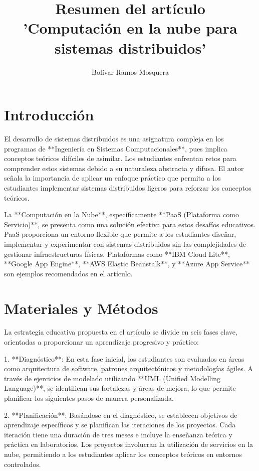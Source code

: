 \documentclass[9pt,twocolumn,twoside]{opticajnl}
\title{Resumen del artículo 'Computación en la nube para sistemas distribuidos'}
\author[1]{Bolívar Ramos Mosquera}
\affil[*]{Resumen hecho porFernanda Elizabeth Basurto Muñoz y Willian Javier Cedeño Bravo}
\affil[1]{Universidad de Guayaquil, Ecuador.}
\begin{document}
\maketitle

\section{Introducción}
El desarrollo de sistemas distribuidos es una asignatura compleja en los programas de **Ingeniería en Sistemas Computacionales**, pues implica conceptos teóricos difíciles de asimilar. Los estudiantes enfrentan retos para comprender estos sistemas debido a su naturaleza abstracta y difusa. El autor señala la importancia de aplicar un enfoque práctico que permita a los estudiantes implementar sistemas distribuidos ligeros para reforzar los conceptos teóricos.

La **Computación en la Nube**, específicamente **PaaS (Plataforma como Servicio)**, se presenta como una solución efectiva para estos desafíos educativos. PaaS proporciona un entorno flexible que permite a los estudiantes diseñar, implementar y experimentar con sistemas distribuidos sin las complejidades de gestionar infraestructuras físicas. Plataformas como **IBM Cloud Lite**, **Google App Engine**, **AWS Elastic Beanstalk**, y **Azure App Service** son ejemplos recomendados en el artículo.

\section{Materiales y Métodos}
La estrategia educativa propuesta en el artículo se divide en seis fases clave, orientadas a proporcionar un aprendizaje progresivo y práctico:

1. **Diagnóstico**: En esta fase inicial, los estudiantes son evaluados en áreas como arquitectura de software, patrones arquitectónicos y metodologías ágiles. A través de ejercicios de modelado utilizando **UML (Unified Modelling Language)**, se identifican sus fortalezas y áreas de mejora, lo que permite planificar los siguientes pasos de manera personalizada.

2. **Planificación**: Basándose en el diagnóstico, se establecen objetivos de aprendizaje específicos y se planifican las iteraciones de los proyectos. Cada iteración tiene una duración de tres meses e incluye la enseñanza teórica y práctica en laboratorios. Los proyectos involucran la utilización de servicios en la nube, permitiendo a los estudiantes aplicar los conceptos teóricos en entornos controlados.
\end{document}
